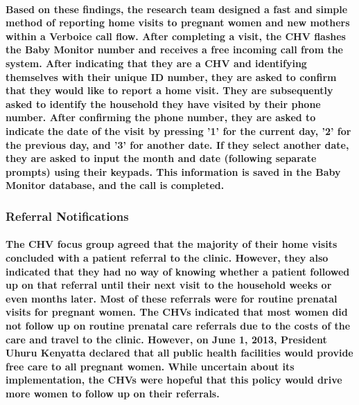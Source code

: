 \paragraph{Based on these findings, the research team designed a fast and simple method of reporting home visits to pregnant women and new mothers within a Verboice call flow. After completing a visit, the CHV flashes the Baby Monitor number and receives a free incoming call from the system. After indicating that they are a CHV and identifying themselves with their unique ID number, they are asked to confirm that they would like to report a home visit. They are subsequently asked to identify the household they have visited by  their phone number. After confirming the phone number, they are asked to indicate the date of the visit by pressing '1' for the current day, '2' for the previous day, and '3' for another date. If they select another date, they are asked to input the month and date (following separate prompts) using their keypads. This information is saved in the Baby Monitor database, and the call is completed.}


\subsubsection{Referral Notifications}
\paragraph{The CHV focus group agreed that the majority of their home visits concluded with a patient referral to the clinic. However, they also indicated that they had no way of knowing whether a patient followed up on that referral until their next visit to the household weeks or even months later. Most of these referrals were for routine prenatal visits for pregnant women. The CHVs indicated that most women did not follow up on routine prenatal care referrals due to the costs of the care and travel to the clinic. However, on June 1, 2013, President Uhuru Kenyatta declared that all public health facilities would provide free care to all pregnant women. While uncertain about its implementation, the CHVs were hopeful that this policy would drive more women to follow up on their referrals. }

